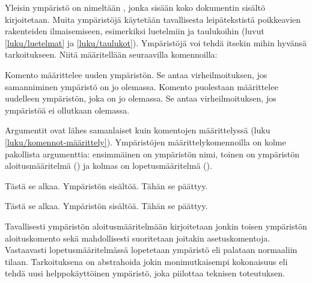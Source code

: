 \begin{koodilohkosis}
\begin{nimi}
\end{nimi}
\end{koodilohkosis}

\noindent
Yleisin ympäristö on nimeltään , jonka sisään koko
dokumentin sisältö kirjoitetaan. Muita ympäristöjä käytetään
tavallisesta leipätekstistä poikkeavien rakenteiden ilmaisemiseen,
esimerkiksi luetelmiin ja taulukoihin (luvut \ref{luku/luetelmat} ja
\ref{luku/taulukot}). Ympäristöjä voi tehdä itsekin mihin hyvänsä
tarkoitukseen. Niitä määritellään seuraavilla komennoilla:

\begin{koodilohkosis}
\newenvironment   {nimi}[n][oletus]{aloitus}{lopetus}
\renewenvironment {nimi}[n][oletus]{aloitus}{lopetus}
\end{koodilohkosis}

\noindent
Komento  määrittelee uuden ympäristön. Se antaa
virheilmoituksen, jos samanniminen ympäristö on jo olemassa. Komento
 puolestaan määrittelee uudelleen ympäristön,
joka on jo olemassa. Se antaa virheilmoituksen, jos ympäristöä ei
ollutkaan olemassa.

Argumentit ovat lähes samanlaiset kuin komentojen määrittelyssä (luku
\ref{luku/komennot-määrittely}). Ympäristöjen määrittelykomennoilla on
kolme pakollista argumenttia: ensimmäinen on ympäristön nimi, toinen on
ympäristön aloitusmääritelmä () ja kolmas on
lopetusmääritelmä ().

\begin{koodilohkosis}
\newenvironment{ymp}{Tästä se alkaa.}{Tähän se päättyy.}

\begin{ymp}
  Ympäristön sisältöä.
\end{ymp}
\end{koodilohkosis}

\begin{tulossis}
  Tästä se alkaa. Ympäristön sisältöä. Tähän se päättyy.
\end{tulossis}

\noindent
Tavallisesti ympäristön aloitusmääritelmään kirjoitetaan jonkin toisen
ympäristön aloituskomento sekä mahdollisesti suoritetaan joitakin
asetuskomentoja. Vastaavasti lopetusmääritelmässä lopetetaan ympäristö
eli palataan normaaliin tilaan. Tarkoituksena on abstrahoida jokin
monimutkaisempi kokonaisuus eli tehdä uusi helppokäyttöinen ympäristö, joka
piilottaa teknisen toteutuksen.

